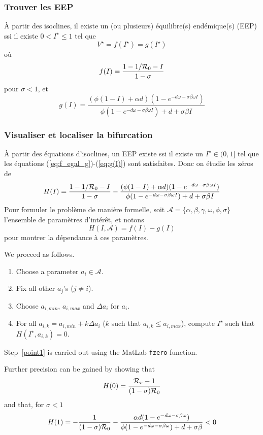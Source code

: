 \documentclass[aspectratio=169]{beamer}\usepackage[]{graphicx}\usepackage[]{xcolor}
\begin{document}
\begin{frame}\frametitle{Trouver les EEP}
À partir des isoclines, il existe un (ou plusieurs) équilibre(s) endémique(s)
(EEP) ssi il existe $0<I^\star\leq 1$ tel que
\begin{equation}
 V^\star=f(I^\star)=g(I^\star)
 \label{eq:f_egal_g}
\end{equation}
où
\begin{equation}
 f(I)=\frac{1-1/\mathcal{R}_0-I}{1-\sigma}
 \label{eq:f(I)}
\end{equation}
pour $\sigma<1$, et
\begin{equation}
 g(I)=\frac{(\phi(1-I)+\alpha d)(1-e^{-d\omega-\sigma\beta\omega I})}
 {\phi(1-e^{-d\omega-\sigma\beta\omega I})+d+\sigma\beta I}
 \label{eq:g(I)}
\end{equation}
\end{frame}


\begin{frame}\frametitle{Visualiser et localiser la bifurcation}
À partir des équations d'isoclines, un EEP existe ssi il existe un
$I^\star\in(0,1]$ tel que les équations (\ref{eq:f_egal_g})-(\ref{eq:g(I)})
sont satisfaites.
Donc on étudie les zéros de
\[
H(I)=\frac{1-1/\mathcal{R}_0-I}{1-\sigma} -
\frac{(\phi(1-I)+\alpha d)(1-e^{-d\omega-\sigma\beta\omega I})}
{\phi(1-e^{-d\omega-\sigma\beta\omega I})+d+\sigma\beta I}
\]
Pour formuler le problème de manière formelle, soit
$\mathcal{A}=\{\alpha,\beta,\gamma,\omega,\phi,\sigma\}$ l'ensemble de
paramètres d'intérêt, et notons
\begin{equation}
H(I,\mathcal{A})=
f(I)-g(I)
\label{eq:H}
\end{equation}
pour montrer la dépendance à ces paramètres.
\end{frame}

\begin{frame}
We proceed as follows.
\begin{enumerate}
\item Choose a parameter $a_i\in\mathcal{A}$.
\item Fix all other $a_j$'s ($j\neq i$).
\item Choose $a_{i,min}$, $a_{i,max}$ and
 $\Delta a_i$ for $a_i$.
\item For all
  $a_{i,k}=a_{i,min}+k\Delta a_i$ ($k$
  such that $a_{i,k}\leq a_{i,max}$), compute
  $I^\star$ such that $H(I^\star,a_{i,k})=0$. \label{point1}
\end{enumerate}
Step~\ref{point1} is carried out using the {\sc MatLab} {\tt fzero}
function.

Further precision can be gained by showing that
\[
H(0)=\frac{\mathcal{R}_v-1}{(1-\sigma)\mathcal{R}_0}
\]
and that, for $\sigma<1$
\[
H(1)=-\frac{1}{(1-\sigma)\mathcal{R}_0}-\frac{\alpha
d(1-e^{-d\omega-\sigma\beta\omega})}{\phi(1
-e^{-d\omega-\sigma\beta\omega})+d+\sigma\beta}<0
\]
\end{frame}
\end{document}
